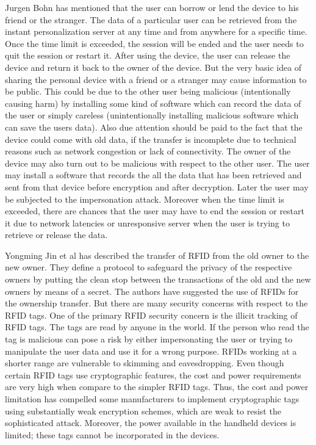 \documentclass[letterpaper]{article}
\begin{document}
\par
Jurgen Bohn \cite{jb} has mentioned that the user can borrow or lend the device to his friend or the stranger. The data of a particular user can be retrieved from the instant personalization server at any time and from anywhere for a specific time. Once the time limit is exceeded, the session will be ended and the user needs to quit the session or restart it. After using the device, the user can release the device and return it back to the owner of the device. But the very basic idea of sharing the personal device with a friend or a stranger may cause information to be public. This could be due to the other user being malicious (intentionally causing harm) by installing some kind of software which can record the data of the user or simply careless (unintentionally installing malicious software which can save the users data). Also due attention should be paid to the fact that the device could come with old data, if the transfer is incomplete due to technical reasons such as network congestion or lack of connectivity. The owner of the device may also turn out to be malicious with respect to the other user. The user may install a software that records the all the data that has been retrieved and sent from that device before encryption and after decryption. Later the user may be subjected to the impersonation attack. Moreover when the time limit is exceeded, there are chances that the user may have to end the session or restart it due to network latencies or unresponsive server when the user is trying to retrieve or release the data. 
\par
Yongming Jin et al \cite{yhz} has described the transfer of RFID from the old owner to the new owner. They define a protocol to safeguard the privacy of the respective owners by putting the clean stop between the transactions of the old and the new owners by means of a secret. The authors have suggested the use of RFIDs for the ownership transfer. But there are many security concerns with respect to the RFID tags. One of the primary RFID security concern is the illicit tracking of RFID tags. The tags are read by anyone in the world. If the person who read the tag is malicious can pose a risk by either impersonating the user or trying to manipulate the user data and use it for a wrong purpose. RFIDs working at a shorter range are vulnerable to skimming and eavesdropping. Even though certain RFID tags use cryptographic features, the cost and power requirements are very high when compare to the simpler RFID tags. Thus, the cost and power limitation has compelled some manufacturers to implement cryptographic tags using substantially weak encryption schemes, which are weak to resist the sophisticated attack. Moreover, the power available in the handheld devices is limited; these tags cannot be incorporated in the devices.
\end{document}

